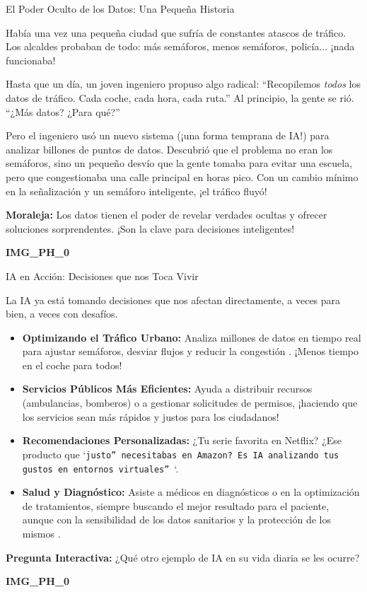 \documentclass[aspectratio=169]{beamer}
\begin{document}
\begin{frame}[fragile]{El Poder Oculto de los Datos: Una Pequeña Historia}


Había una vez una pequeña ciudad que sufría de constantes atascos de tráfico. Los alcaldes probaban de todo: más semáforos, menos semáforos, policía... ¡nada funcionaba!

Hasta que un día, un joven ingeniero propuso algo radical: ``Recopilemos \textit{todos} los datos de tráfico. Cada coche, cada hora, cada ruta.''
Al principio, la gente se rió. ``¿Más datos? ¿Para qué?''

Pero el ingeniero usó un nuevo sistema (¡una forma temprana de IA!) para analizar billones de puntos de datos. Descubrió que el problema no eran los semáforos, sino un pequeño desvío que la gente tomaba para evitar una escuela, pero que congestionaba una calle principal en horas pico. Con un cambio mínimo en la señalización y un semáforo inteligente, ¡el tráfico fluyó!

\textbf{Moraleja:} Los datos tienen el poder de revelar verdades ocultas y ofrecer soluciones sorprendentes. ¡Son la clave para decisiones inteligentes!

\textbf{IMG\_PH\_0}

\end{frame}



\begin{frame}[fragile]{IA en Acción: Decisiones que nos Toca Vivir}


La IA ya está tomando decisiones que nos afectan directamente, a veces para bien, a veces con desafíos.

\begin{itemize}
  \item \textbf{Optimizando el Tráfico Urbano:} Analiza millones de datos en tiempo real para ajustar semáforos, desviar flujos y reducir la congestión \texttt{\cite{Aparicio Araque, 2025}}. ¡Menos tiempo en el coche para todos!
  \item \textbf{Servicios Públicos Más Eficientes:} Ayuda a distribuir recursos (ambulancias, bomberos) o a gestionar solicitudes de permisos, ¡haciendo que los servicios sean más rápidos y justos para los ciudadanos!
  \item \textbf{Recomendaciones Personalizadas:} ¿Tu serie favorita en Netflix? ¿Ese producto que `\texttt{justo'' necesitabas en Amazon? Es IA analizando tus gustos en }\texttt{entornos virtuales'' }\cite{Méndez Saldaña, N/A}`.
  \item \textbf{Salud y Diagnóstico:} Asiste a médicos en diagnósticos o en la optimización de tratamientos, siempre buscando el mejor resultado para el paciente, aunque con la sensibilidad de los datos sanitarios y la protección de los mismos \texttt{\cite{Zouak Lara, 2025}}.
\end{itemize}
\textbf{Pregunta Interactiva:} ¿Qué otro ejemplo de IA en su vida diaria se les ocurre?

\textbf{IMG\_PH\_0}

\end{frame}
\end{document}
